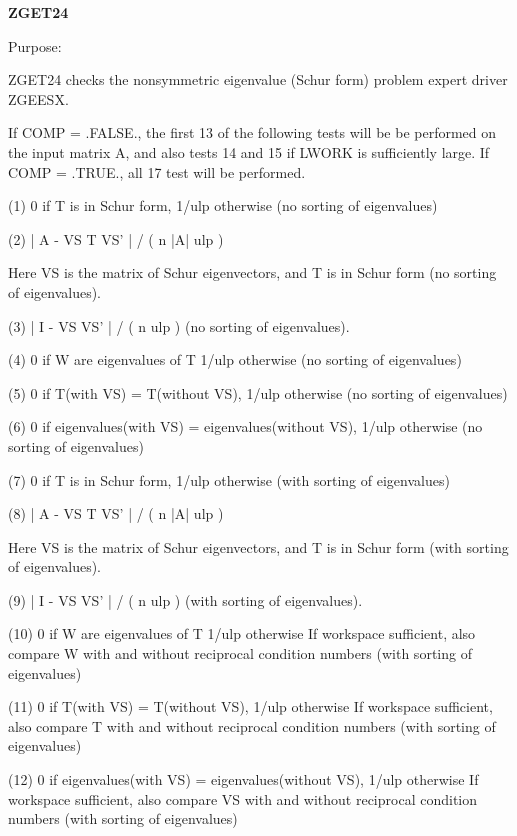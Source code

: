{\bfseries Z\+G\+E\+T24} 

\begin{DoxyParagraph}{Purpose\+: }
\begin{DoxyVerb}    ZGET24 checks the nonsymmetric eigenvalue (Schur form) problem
    expert driver ZGEESX.

    If COMP = .FALSE., the first 13 of the following tests will be
    be performed on the input matrix A, and also tests 14 and 15
    if LWORK is sufficiently large.
    If COMP = .TRUE., all 17 test will be performed.

    (1)     0 if T is in Schur form, 1/ulp otherwise
           (no sorting of eigenvalues)

    (2)     | A - VS T VS' | / ( n |A| ulp )

      Here VS is the matrix of Schur eigenvectors, and T is in Schur
      form  (no sorting of eigenvalues).

    (3)     | I - VS VS' | / ( n ulp ) (no sorting of eigenvalues).

    (4)     0     if W are eigenvalues of T
            1/ulp otherwise
            (no sorting of eigenvalues)

    (5)     0     if T(with VS) = T(without VS),
            1/ulp otherwise
            (no sorting of eigenvalues)

    (6)     0     if eigenvalues(with VS) = eigenvalues(without VS),
            1/ulp otherwise
            (no sorting of eigenvalues)

    (7)     0 if T is in Schur form, 1/ulp otherwise
            (with sorting of eigenvalues)

    (8)     | A - VS T VS' | / ( n |A| ulp )

      Here VS is the matrix of Schur eigenvectors, and T is in Schur
      form  (with sorting of eigenvalues).

    (9)     | I - VS VS' | / ( n ulp ) (with sorting of eigenvalues).

    (10)    0     if W are eigenvalues of T
            1/ulp otherwise
            If workspace sufficient, also compare W with and
            without reciprocal condition numbers
            (with sorting of eigenvalues)

    (11)    0     if T(with VS) = T(without VS),
            1/ulp otherwise
            If workspace sufficient, also compare T with and without
            reciprocal condition numbers
            (with sorting of eigenvalues)

    (12)    0     if eigenvalues(with VS) = eigenvalues(without VS),
            1/ulp otherwise
            If workspace sufficient, also compare VS with and without
            reciprocal condition numbers
            (with sorting of eigenvalues)


\end{DoxyVerb}
\end{DoxyParagraph}
